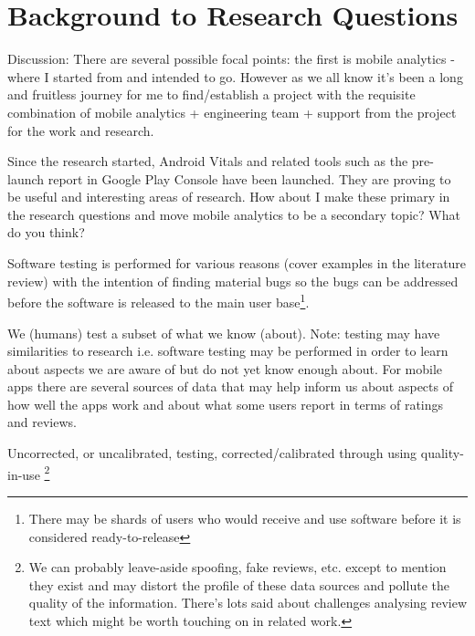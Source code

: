 \chapter{Background to Research Questions}
\begin{WrapText}
Discussion: There are several possible focal points: the first is mobile analytics - where I started from and intended to go. However as we all know it's been a long and fruitless journey for me to find/establish a project with the requisite combination of mobile analytics + engineering team + support from the project for the work and research. 

Since the research started, Android Vitals and related tools such as the pre-launch report in Google Play Console have been launched. They are proving to be useful and interesting areas of research. How about I make these primary in the research questions and move mobile analytics to be a secondary topic? What do you think?
\end{WrapText}

Software testing is performed for various reasons (cover examples in the literature review) with the intention of finding material bugs so the bugs can be addressed before the software is released to the main user base\footnote{There may be shards of users who would receive and use software before it is considered ready-to-release }. 

We (humans) test a subset of what we know (about). Note: testing may have similarities to research i.e. software testing may be performed in order to learn about aspects we are aware of but do not yet know enough about. For mobile apps there are several sources of data that may help inform us about aspects of how well the apps work and about what some users report in terms of ratings and reviews. 

Uncorrected, or uncalibrated, testing, corrected/calibrated through using quality-in-use \footnote{We can probably leave-aside spoofing, fake reviews, etc. except to mention they exist and may distort the profile of these data sources and pollute the quality of the information. There's lots said about challenges analysing review text which might be worth touching on in related work.}

